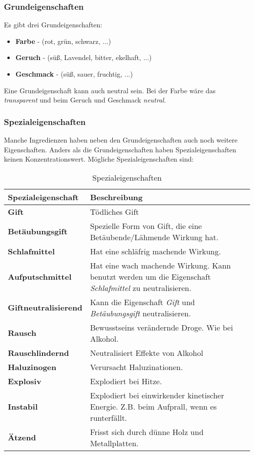 \subsubsection{Grundeigenschaften}
Es gibt drei Grundeigenschaften:
\begin{itemize}
\item \textbf{Farbe} - (rot, grün, schwarz, ...)
\item \textbf{Geruch} - (süß, Lavendel, bitter, ekelhaft, ...)
\item \textbf{Geschmack} - (süß, sauer, fruchtig, ...)
\end{itemize}

Eine Grundeigenschaft kann auch neutral sein. Bei der Farbe wäre das \textit{transparent} und beim Geruch und Geschmack \textit{neutral}. 

\subsubsection{Spezialeigenschaften}
\label{chap:spezialeigenschaften}
Manche Ingredienzen haben neben den Grundeigenschaften auch noch weitere Eigenschaften. Anders als die Grundeigenschaften haben Spezialeigenschaften keinen Konzentrationswert. Mögliche Spezialeigenschaften sind:

\begin{table}[h]
\begin{center}
\begin{tabular}{|p{}|p{11cm}|}
\hline
\textbf{Spezialeigenschaft} & \textbf{Beschreibung} \\ \hline
\textbf{Gift} & Tödliches Gift \\ \hline
\textbf{Betäubungsgift} & Spezielle Form von Gift, die eine Betäubende/Lähmende Wirkung hat. \\ \hline
\textbf{Schlafmittel} & Hat eine schläfrig machende Wirkung. \\ \hline
\textbf{Aufputschmittel} & Hat eine wach machende Wirkung. Kann benutzt werden um die Eigenschaft \textit{Schlafmittel} zu neutralisieren. \\ \hline
\textbf{Giftneutralisierend} & Kann die Eigenschaft \textit{Gift} und \textit{Betäubungsgift} neutralisieren. \\ \hline
\textbf{Rausch} & Bewusstseins verändernde Droge. Wie bei Alkohol. \\ \hline
\textbf{Rauschlindernd} & Neutralisiert Effekte von Alkohol \\ \hline
\textbf{Haluzinogen} & Verursacht Haluzinationen. \\ \hline
\textbf{Explosiv} & Explodiert bei Hitze. \\ \hline
\textbf{Instabil} & Explodiert bei einwirkender kinetischer Energie. Z.B. beim Aufprall, wenn es runterfällt. \\ \hline
\textbf{Ätzend} & Frisst sich durch dünne Holz und Metallplatten. \\ \hline
\end{tabular}
\end{center}
\caption{Spezialeigenschaften}
\label{tab:spezialeigenschaften}
\end{table}


